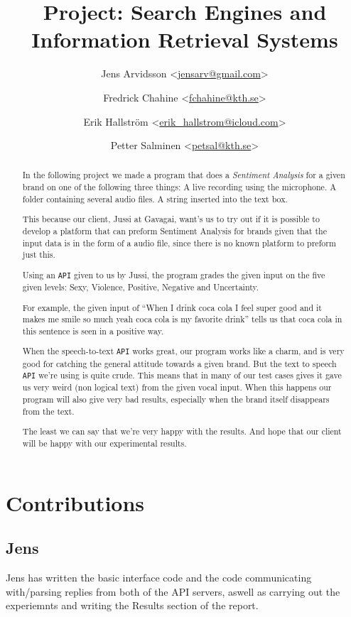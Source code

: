 \documentclass[a4paper,12pt,twoside]{ltxdoc}
\title{Project: Search Engines and Information Retrieval Systems}
\author{
Jens Arvidsson <\href{mailto:jensarv@gmail.com}{jensarv@gmail.com}> \and
Fredrick Chahine <\href{mailto:fchahine@kth.se}{fchahine@kth.se}> \and
Erik Hallström  <\href{mailto:erik_hallstrom@icloud.com}{erik\_hallstrom@icloud.com}> \and
Petter Salminen <\href{mailto:petsal@kth.se}{petsal@kth.se}>}
\begin{document}
\maketitle
\tableofcontents

\newpage
\begin{abstract}
In the following project we made a program that does a \emph{Sentiment Analysis} for a given brand on one of the following three things: A live recording using the microphone. A folder containing several audio files. A string inserted into the text box.

This because our client, Jussi at Gavagai, want's us to try out if it is possible to develop a platform that can preform Sentiment Analysis for brands given that the input data is in the form of a audio file, since there is no known platform to preform just this. 

Using an \verb#API# given to us by Jussi, the program grades the given input on the five given levels: Sexy, Violence, Positive, Negative and Uncertainty. 

For example, the given input of ``When I drink coca cola I feel super good and it makes me smile so much yeah coca cola is my favorite drink'' tells us that coca cola in this sentence is seen in a positive way. 

When the speech-to-text \verb#API# works great, our program works like a charm, and is very good for catching the general attitude towards a given brand. But the text to speech \verb#API# we're using is quite crude. This means that in many of our test cases gives it gave us very weird (non logical text) from the given vocal input. When this happens our program will also give very bad results, especially when the brand itself disappears from the text.

The least we can say that we're very happy with the results. And hope that our client will be happy with our experimental results.
\end{abstract}

\section{Contributions}
\subsection{Jens}
Jens has written the basic interface code and the code communicating with/parsing replies from both of the API servers, aswell as carrying out the experiemnts and writing the Results section of the report.
\end{document}
